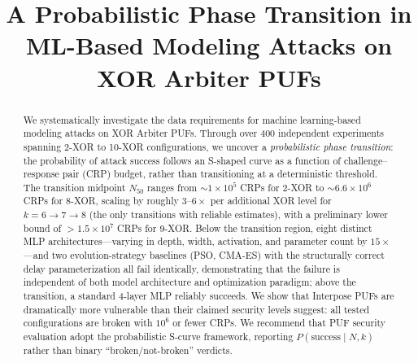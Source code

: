 \documentclass[journal=tches,version=preprint]{iacrj_local}
\title[running={Probabilistic Phase Transition in ML Attacks on XOR APUFs}]
      {A Probabilistic Phase Transition in ML-Based Modeling Attacks on XOR Arbiter PUFs}
\begin{document}
\maketitle

\begin{abstract}
We systematically investigate the data requirements for machine learning-based
modeling attacks on XOR Arbiter PUFs. Through over 400 independent experiments
spanning 2-XOR to 10-XOR configurations, we uncover a \emph{probabilistic phase
transition}: the probability of attack success follows an S-shaped curve as a
function of challenge--response pair (CRP) budget, rather than transitioning at
a deterministic threshold. The transition midpoint $N_{50}$ ranges from
$\sim 1\times10^5$ CRPs for 2-XOR to $\sim 6.6\times10^6$ CRPs for 8-XOR,
scaling by roughly $3$--$6\times$ per additional XOR level for
$k = 6\to7\to8$ (the only transitions with reliable estimates), with a
preliminary lower bound of $>1.5\times10^7$ CRPs for 9-XOR.
Below the transition region, eight distinct MLP
architectures---varying in depth, width, activation, and parameter count by
$15\times$---and two evolution-strategy baselines (PSO, CMA-ES) with the
structurally correct delay parameterization all fail identically,
demonstrating that the failure is independent of both model architecture and
optimization paradigm; above the transition, a standard 4-layer MLP reliably
succeeds. We show that Interpose PUFs are dramatically more vulnerable than
their claimed security levels suggest: all tested configurations are broken
with $10^6$ or fewer CRPs. We recommend that PUF security evaluation adopt the
probabilistic S-curve framework, reporting $P(\text{success} \mid N, k)$
rather than binary ``broken/not-broken'' verdicts.
\end{abstract}










\end{document}

